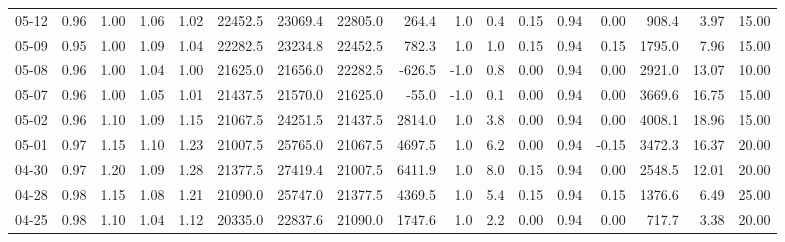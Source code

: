 \begin{threeparttable}
{\begin{tabular}{lrrrrrrrrrrrrrrrr}
  05-12 &         0.96 &           1.00 &          1.06 &          1.02 & 22452.5 & 23069.4 & 22805.0 &      264.4 &                      1.0 &                 0.4 &       0.15 &      0.94 &           0.00 &            908.4 &            3.97 &                  15.00 \\
  05-09 &         0.95 &           1.00 &          1.09 &          1.04 & 22282.5 & 23234.8 & 22452.5 &      782.3 &                      1.0 &                 1.0 &       0.15 &      0.94 &           0.15 &           1795.0 &            7.96 &                  15.00 \\
  05-08 &         0.96 &           1.00 &          1.04 &          1.00 & 21625.0 & 21656.0 & 22282.5 &     -626.5 &                     -1.0 &                 0.8 &       0.00 &      0.94 &           0.00 &           2921.0 &           13.07 &                  10.00 \\
  05-07 &         0.96 &           1.00 &          1.05 &          1.01 & 21437.5 & 21570.0 & 21625.0 &      -55.0 &                     -1.0 &                 0.1 &       0.00 &      0.94 &           0.00 &           3669.6 &           16.75 &                  15.00 \\
  05-02 &         0.96 &           1.10 &          1.09 &          1.15 & 21067.5 & 24251.5 & 21437.5 &     2814.0 &                      1.0 &                 3.8 &       0.00 &      0.94 &           0.00 &           4008.1 &           18.96 &                  15.00 \\
  05-01 &         0.97 &           1.15 &          1.10 &          1.23 & 21007.5 & 25765.0 & 21067.5 &     4697.5 &                      1.0 &                 6.2 &       0.00 &      0.94 &          -0.15 &           3472.3 &           16.37 &                  20.00 \\
  04-30 &         0.97 &           1.20 &          1.09 &          1.28 & 21377.5 & 27419.4 & 21007.5 &     6411.9 &                      1.0 &                 8.0 &       0.15 &      0.94 &           0.00 &           2548.5 &           12.01 &                  20.00 \\
  04-28 &         0.98 &           1.15 &          1.08 &          1.21 & 21090.0 & 25747.0 & 21377.5 &     4369.5 &                      1.0 &                 5.4 &       0.15 &      0.94 &           0.15 &           1376.6 &            6.49 &                  25.00 \\
  04-25 &         0.98 &           1.10 &          1.04 &          1.12 & 20335.0 & 22837.6 & 21090.0 &     1747.6 &                      1.0 &                 2.2 &       0.00 &      0.94 &           0.00 &            717.7 &            3.38 &                  20.00 \\

\end{tabular}}
\end{threeparttable}
